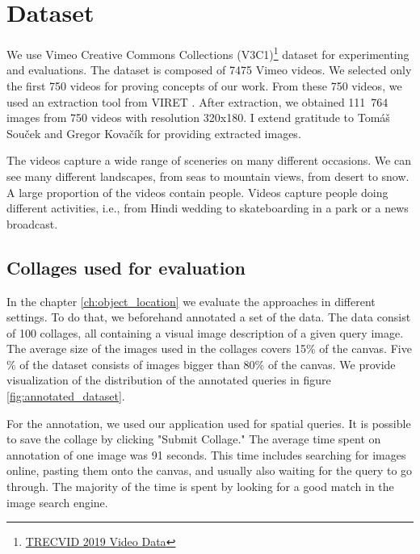 \section{Dataset}
\label{s:dataset}

We use Vimeo Creative Commons Collections (V3C1)\footnote{\href{https://www-nlpir.nist.gov/projects/tv2019/data.html}{TRECVID 2019 Video Data}} dataset for experimenting and evaluations. The dataset is composed of 7475 Vimeo videos. We selected only the first 750 videos for proving concepts of our work. From these 750 videos, we used an extraction tool from VIRET \cite{lokovc2019framework}. After extraction, we obtained 111\ 764 images from 750 videos with resolution 320x180. I extend gratitude to Tomáš Souček and Gregor Kovačík for providing extracted images.

The videos capture a wide range of sceneries on many different occasions. We can see many different landscapes, from seas to mountain views, from desert to snow. A large proportion of the videos contain people. Videos capture people doing different activities, i.e., from Hindi wedding to skateboarding in a park or a news broadcast.

\subsection{Collages used for evaluation}

In the chapter \ref{ch:object_location} we evaluate the approaches in different settings. To do that, we beforehand annotated a set of the data. The data consist of 100 collages, all containing a visual image description of a given query image. The average size of the images used in the collages covers 15\% of the canvas. Five \% of the dataset consists of images bigger than 80\% of the canvas. We provide visualization of the distribution of the annotated queries in figure \ref{fig:annotated_dataset}.

For the annotation, we used our application used for spatial queries. It is possible to save the collage by clicking "Submit Collage." The average time spent on annotation of one image was 91 seconds. This time includes searching for images online, pasting them onto the canvas, and usually also waiting for the query to go through. The majority of the time is spent by looking for a good match in the image search engine.

